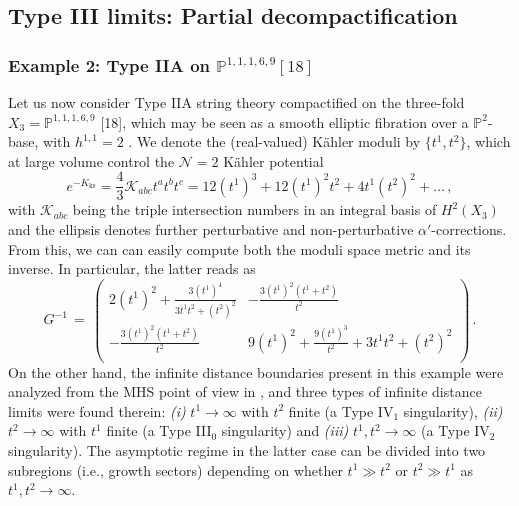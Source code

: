 \subsection{Type III limits: Partial decompactification}
\label{ss:typeIIIlimits}
	
\subsubsection{Example 2: Type IIA on $\mathbb{P}^{1,1,1,6,9} [18]$}
\label{sss:ExampleII}
	
Let us now consider Type IIA string theory compactified on the three-fold $X_3=\mathbb{P}^{1,1,1,6,9}$ [18], which may be seen as a smooth elliptic fibration over a $\mathbb{P}^2$-base, with $h^{1,1}=2$ \cite{Candelas:1994hw}. We denote the (real-valued) K\"ahler moduli by $\lbrace t^1, t^2 \rbrace$, which at large volume control the $\mathcal{N}=2$ K\"ahler potential
%
\begin{equation}\label{eq:kahlerpotP11169}
	e^{-K_{\text{ks}}} = \frac{4}{3}\mathcal{K}_{abc}t^a t^b t^c = 12(t^1)^3 + 12(t^1)^2 t^2 + 4 t^1(t^2)^2 + \ldots\, ,
\end{equation}
%
with $\mathcal{K}_{abc}$ being the triple intersection numbers in an integral basis of $H^2(X_3)$ and the ellipsis denotes further perturbative and non-perturbative $\alpha'$-corrections. From this, we can can easily compute both the moduli space metric and its inverse. In particular, the latter reads as
%
\begin{equation}\label{eq:fullinversemetric}
	G^{-1}\, = \, \left(
	\begin{array}{cc}
		2(t^1)^2 +\frac{3(t^1)^4}{3t^1t^2+(t^2)^2}& - \frac{3(t^1)^2 \left(t^1+t^2\right)}{t^2}  \\
		- \frac{3(t^1)^2 \left(t^1+t^2\right)}{t^2} & 9(t^1)^2+ \frac{9(t^1)^3}{t^2} +3t^1t^2 +(t^2)^2 \\
	\end{array}
	\right) \, .
\end{equation}
%	
On the other hand, the infinite distance boundaries present in this example were analyzed from the MHS point of view in \cite{Grimm:2018cpv}, and three types of infinite distance limits were found therein: \emph{(i)} $t^1 \to \infty$ with $t^2$ finite (a Type IV$_1$ singularity), \emph{(ii)} $t^2 \to \infty$ with $t^1$ finite (a Type III$_0$ singularity) and \emph{(iii)} $t^1, t^2 \to \infty$ (a Type IV$_2$ singularity). The asymptotic regime in the latter case can be divided into two subregions (i.e., growth sectors) depending on whether $t^1\gg t^2 $ or $t^2\gg t^1 $ as $t^1, t^2 \to \infty$. 	
	
